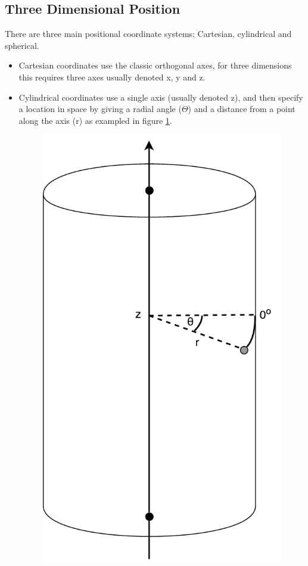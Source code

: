 \subsection{Three Dimensional Position}
There are three main positional coordinate systems; Cartesian, cylindrical and spherical.
\begin{itemize}
\item Cartesian coordinates use the classic orthogonal axes, for three dimensions this requires three axes usually denoted x, y and z.
\item Cylindrical coordinates use a single axis (usually denoted z), and then specify a location in space by giving a radial angle (\(\Theta\)) and a distance from a point along the axis (r) as exampled in figure \ref{fig:cylindricalcoordinates}.

\begin{figure}[t!]
	\centering
	\includegraphics[height=0.45\textheight]{cylindrical.pdf}
	\label{fig:cylindricalcoordinates}
\end{figure}


\end{itemize}
